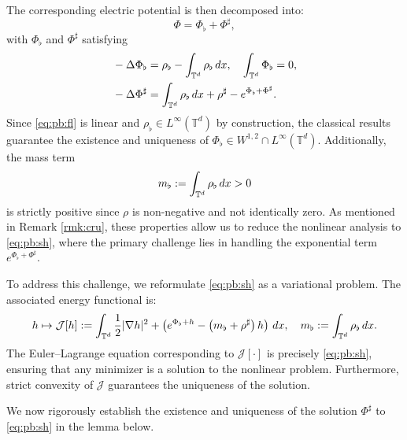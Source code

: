 \documentclass[11pt,reqno,a4paper]{amsart}
\newcommand{\intt}{\int_{\T^d}}
\theoremstyle{definition}
\theoremstyle{remark}
\numberwithin{equation}{section}
\newcommand{\T} {\mathbb T}
\newcommand{\lt}{\left}
\newcommand{\rt}{\right}
\newcommand{\bq}{\begin{equation}}
\newcommand{\eq}{\end{equation}}
\newcommand{\calJ}{\mathcal J}
\newcommand{\dx}{\textnormal{d}x}
\begin{document}
The corresponding electric potential is then decomposed into:
\[
\Phi = \Phi_\flat + \Phi^\sharp,
\]
with $\Phi_\flat $ and $\Phi^\sharp$ satisfying
\begin{align}
\label{eq:pb:fl}
    &-\Delta \Phi_\flat = \rho_\flat - \int_{\T^d} \rho_\flat \, \dx, \quad \int_{\T^d} \Phi_\flat = 0,\\
\label{eq:pb:sh}    
    &-\Delta \Phi^\sharp = \int_{\T^d} \rho_\flat \, \dx + \rho^\sharp - e^{\Phi_\flat + \Phi^\sharp}.
\end{align}
Since \eqref{eq:pb:fl} is linear and $\rho_\flat \in L^\infty(\T^d)$ by construction, the classical results guarantee the existence and uniqueness of $\Phi_\flat \in W^{1,2} \cap L^\infty(\T^d)$. Additionally, the mass term
\[
m_\flat:= \intt \rho_\flat\,\dx >0
\]
is strictly positive since $\rho$ is non-negative and not identically zero. As mentioned in Remark \ref{rmk:cru}, these properties allow us to reduce the nonlinear analysis to \eqref{eq:pb:sh}, where the primary challenge lies in handling the exponential term $e^{\Phi_\flat + \Phi^\sharp}$.

To address this challenge, we reformulate \eqref{eq:pb:sh} as a variational problem. The associated energy functional is:
\bq\label{calj}
h \mapsto \calJ[h]:= \intt \frac{1}{2}|\nabla h|^2 + \lt(e^{\Phi_\flat + h} - \lt(m_\flat + \rho^\sharp \rt)h\rt) \, \dx,\quad m_\flat:=\intt \rho_\flat\,\dx.
\eq
The Euler--Lagrange equation corresponding to $\calJ[\cdot]$ is precisely \eqref{eq:pb:sh}, ensuring that any minimizer is a solution to the nonlinear problem. Furthermore, strict convexity of $\calJ$ guarantees the uniqueness of the solution.



We now rigorously establish the existence and uniqueness of the solution $\Phi^\sharp$ to \eqref{eq:pb:sh} in the lemma below.
\end{document}
